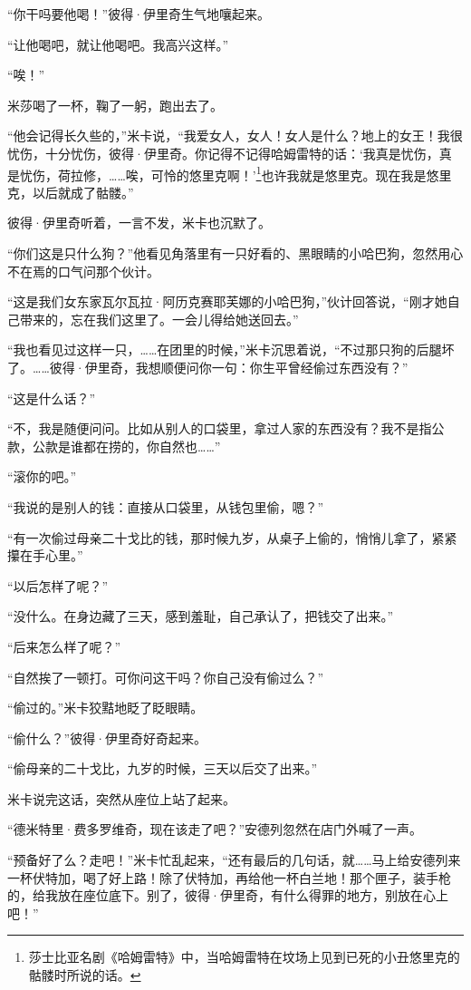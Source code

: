 \par “你干吗要他喝！”彼得·伊里奇生气地嚷起来。
\par “让他喝吧，就让他喝吧。我高兴这样。”
\par “唉！”
\par 米莎喝了一杯，鞠了一躬，跑出去了。
\par “他会记得长久些的，”米卡说，“我爱女人，女人！女人是什么？地上的女王！我很忧伤，十分忧伤，彼得·伊里奇。你记得不记得哈姆雷特的话：‘我真是忧伤，真是忧伤，荷拉修，……唉，可怜的悠里克啊！’\footnote{莎士比亚名剧《哈姆雷特》中，当哈姆雷特在坟场上见到已死的小丑悠里克的骷髅时所说的话。}也许我就是悠里克。现在我是悠里克，以后就成了骷髅。”
\par 彼得·伊里奇听着，一言不发，米卡也沉默了。
\par “你们这是只什么狗？”他看见角落里有一只好看的、黑眼睛的小哈巴狗，忽然用心不在焉的口气问那个伙计。
\par “这是我们女东家瓦尔瓦拉·阿历克赛耶芙娜的小哈巴狗，”伙计回答说，“刚才她自己带来的，忘在我们这里了。一会儿得给她送回去。”
\par “我也看见过这样一只，……在团里的时候，”米卡沉思着说，“不过那只狗的后腿坏了。……彼得·伊里奇，我想顺便问你一句：你生平曾经偷过东西没有？”
\par “这是什么话？”
\par “不，我是随便问问。比如从别人的口袋里，拿过人家的东西没有？我不是指公款，公款是谁都在捞的，你自然也……”
\par “滚你的吧。”
\par “我说的是别人的钱：直接从口袋里，从钱包里偷，嗯？”
\par “有一次偷过母亲二十戈比的钱，那时候九岁，从桌子上偷的，悄悄儿拿了，紧紧攥在手心里。”
\par “以后怎样了呢？”
\par “没什么。在身边藏了三天，感到羞耻，自己承认了，把钱交了出来。”
\par “后来怎么样了呢？”
\par “自然挨了一顿打。可你问这干吗？你自己没有偷过么？”
\par “偷过的。”米卡狡黠地眨了眨眼睛。
\par “偷什么？”彼得·伊里奇好奇起来。
\par “偷母亲的二十戈比，九岁的时候，三天以后交了出来。”
\par 米卡说完这话，突然从座位上站了起来。
\par “德米特里·费多罗维奇，现在该走了吧？”安德列忽然在店门外喊了一声。
\par “预备好了么？走吧！”米卡忙乱起来，“还有最后的几句话，就……马上给安德列来一杯伏特加，喝了好上路！除了伏特加，再给他一杯白兰地！那个匣子，装手枪的，给我放在座位底下。别了，彼得·伊里奇，有什么得罪的地方，别放在心上吧！”
